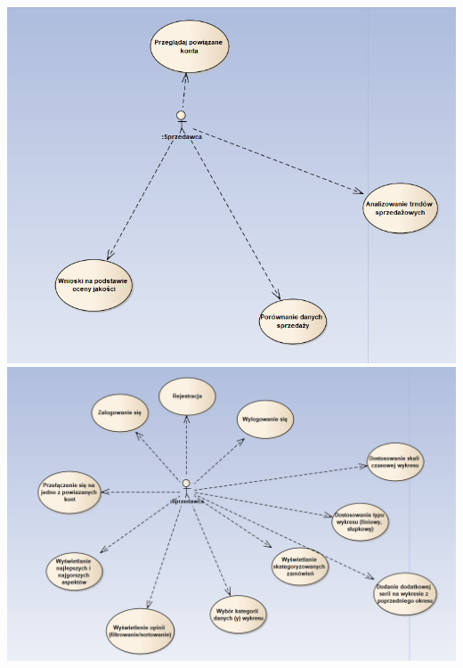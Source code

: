 \documentclass[a4paper,11pt]{article}
\begin{document}
\includegraphics[scale=0.5]{src/u1.png}\\
\includegraphics[scale=0.5]{src/u2.png}\\
\end{document}
